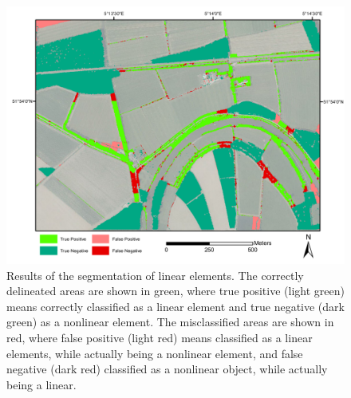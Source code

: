 \begin{figure}
	\centering
	\includegraphics[width=\columnwidth]{./img/segmentation.pdf}
	\caption{Results of the segmentation of linear elements. The correctly delineated areas are shown in green, where true positive (light green) means correctly classified as a linear element and true negative (dark green) as a nonlinear element. The misclassified areas are shown in red, where false positive (light red) means classified as a linear elements, while actually being a nonlinear element, and false negative (dark red) classified as a nonlinear object, while actually being a linear.}
	\label{fig:segmentation}
\end{figure}


